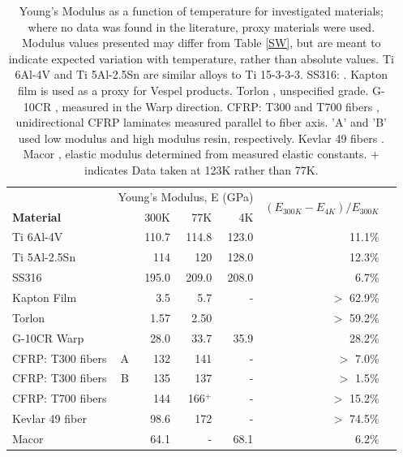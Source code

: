 \documentclass[final]{svjour2}
\begin{document}
\begin{table}[h]

\centering
\begin{threeparttable}
\begin{tabular}{lrrrrrr}
\toprule
&  \multicolumn{4}{c}{Young's Modulus, E (GPa)} & \multirow{2}{*}{$(E_{300K} - E_{4K})/ E_{300K}$}\\
\textbf{Material} & & \@ \quad\quad 300K & \@ \quad\quad 77K & \@ \quad\quad 4K  \\
\midrule
Ti 6Al-4V & & 110.7 & 114.8 & 123.0 & 11.1\% \\
Ti 5Al-2.5Sn &  & 114 & 120 & 128.0 & 12.3\% \\
SS316 &  & 195.0 & 209.0 & 208.0 & 6.7\% \\
Kapton Film &  & 3.5 & 5.7 & - & $>$ 62.9\% \\
Torlon & & 1.57 & 2.50 & & $>$ 59.2\% \\
G-10CR Warp & & 28.0 & 33.7 & 35.9 & 28.2\% \\
CFRP: T300 fibers  & A  & 132 & 141 & - & $>$ 7.0\% \\
CFRP: T300 fibers & B  & 135 & 137 & - & $>$ 1.5\% \\
CFRP: T700 fibers & & 144 & 166$^+$ & - & $>$ 15.2\% \\
Kevlar 49 fiber & & 98.6 & 172 & - & $>$ 74.5\% \\
Macor & & 64.1 & - & 68.1 & 6.2\% \\


\bottomrule
\end{tabular}
\caption{Young's Modulus as a function of temperature for investigated materials; where no data was found in the literature, proxy materials were used. Modulus values presented may differ from Table \ref{SW}, but are meant to indicate expected variation with temperature, rather than absolute values. Ti 6Al-4V \cite{Meester1975} and Ti 5Al-2.5Sn \cite{Ghisi2007} are similar alloys to Ti 15-3-3-3. SS316: \cite{Reed1983}. Kapton film \cite{Yamaoka1995} is used as a proxy for Vespel products. Torlon \cite{Reed1983}, unspecified grade. G-10CR \cite{Kasen1981}, measured in the Warp direction. CFRP: T300 and T700 fibers \cite{Reed1983}, unidirectional CFRP laminates measured parallel to fiber axis. 'A' and 'B' used low modulus and high modulus resin, respectively. Kevlar 49 fibers \cite{James2012}. Macor \cite{Harrington1980}, elastic modulus determined from measured elastic constants. + indicates Data taken at 123K rather than 77K.}
\label{E_table}
\end{threeparttable}
\end{table}
\end{document}
